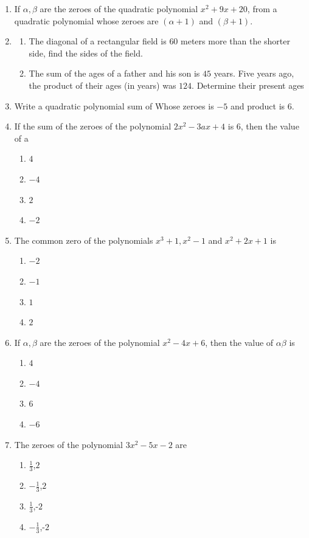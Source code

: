 \begin{enumerate}
\item If $\alpha,\beta$ are the zeroes of the quadratic polynomial $x^2+9x+20$, from a quadratic polynomial whose zeroes are  $(\alpha+1)$ and 
$(\beta+1)$.


\item \begin{enumerate}
\item The diagonal of a rectangular field is $60$ meters more than the shorter side, find the sides of the field.


\item The sum of the ages of a father and his son is $45$ years. Five years ago, the product of their ages (in years) was $124 $. Determine their present ages

\end{enumerate} 


\item Write a quadratic polynomial sum of Whose zeroes is $-5
$ and product is $6$.



\item If the sum of the zeroes of the polynomial $2x^2-3ax+4$ is $6$, then the value of a 
\begin{enumerate}
\item $4$
\item $-4$
\item $2$
\item $-2$
\end{enumerate}

\item The common zero of the polynomials $x^3+1, x^2-1$ and $x^2+2x+1$ is 
\begin{enumerate}
\item $-2$
\item $-1$
\item  $1$
\item  $2$
\end{enumerate}

\item If $\alpha,\beta$ are the zeroes of the polynomial $x^2 - 4x+6$, then the value of $\alpha\beta$ is
\begin{enumerate}
\item $4$
\item $-4$
\item $6$
\item $-6$
\end{enumerate}

\item The zeroes of the polynomial $3x^2-5x-2$ are 
\begin{enumerate}
\item $\frac{1}{3}$,$2$
\item $-\frac{1}{3}$,$2$
\item $\frac{1}{3}$,-$2$
\item $-\frac{1}{3}$,-$2$
\end{enumerate}


\end{enumerate}

